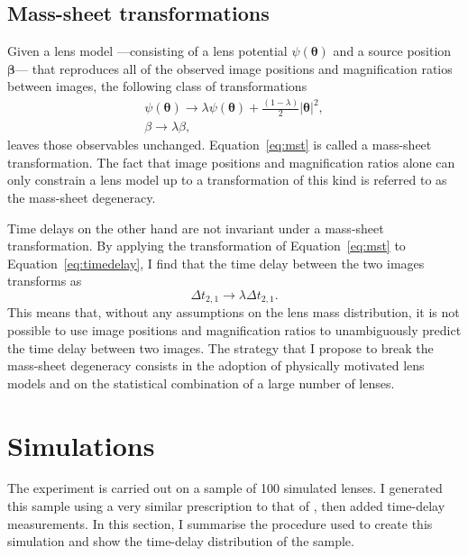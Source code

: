 \documentclass{aa}
\def\Eref#1{Equation~\ref{#1}\xspace}
\begin{document}
\subsection{Mass-sheet transformations}\label{ssec:masssheet}

Given a lens model ---consisting of a lens potential $\psi(\boldsymbol\theta)$ and a source position $\boldsymbol\beta$--- that reproduces all of the observed image positions and magnification ratios between images, the following class of transformations
\begin{align}\label{eq:mst}
\psi(\boldsymbol\theta) \rightarrow \lambda \psi(\boldsymbol\theta) + \frac{(1-\lambda)}{2}|\boldsymbol\theta|^2, \\
\beta \rightarrow \lambda\beta,
\end{align}
leaves those observables unchanged.
 \Eref{eq:mst} is called a mass-sheet transformation. 
The fact that image positions and magnification ratios alone can only constrain a lens model up to a transformation of this kind is referred to as the mass-sheet degeneracy.
 
Time delays on the other hand are not invariant under a mass-sheet transformation. 
By applying the transformation of \Eref{eq:mst} to \Eref{eq:timedelay}, I find that the time delay between the two images transforms as
\begin{equation}
\Delta t_{2,1} \rightarrow \lambda \Delta t_{2,1}.
\end{equation}
This means that, without any assumptions on the lens mass distribution, it is not possible to use image positions and magnification ratios to unambiguously predict the time delay between two images.
The strategy that I propose to break the mass-sheet degeneracy consists in the adoption of physically motivated lens models and on the statistical combination of a large number of lenses.



\section{Simulations}\label{sect:sims}

The experiment is carried out on a sample of 100 simulated lenses. I generated this sample using a very similar prescription to that of , then added time-delay measurements.
In this section, I summarise the procedure used to create this simulation and show the time-delay distribution of the sample.
\end{document}
